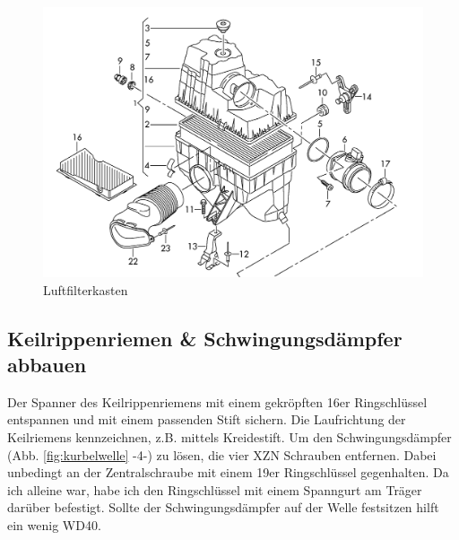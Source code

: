\documentclass[twoside,a4paper]{refart}
\begin{document}
\begin{figure}[htb]
	\begin{center}
		\includegraphics[width=\textwidth]{Luftfilterkasten}
		\caption{Luftfilterkasten}
		\label{fig:luftfilerkasten}
	\end{center}
\end{figure}

\newpage
\subsection{Keilrippenriemen \& Schwingungsdämpfer abbauen}
Der Spanner des Keilrippenriemens mit einem gekröpften 16er Ringschlüssel entspannen und mit einem passenden Stift sichern. Die Laufrichtung der Keilriemens kennzeichnen, z.B. mittels Kreidestift.
Um den Schwingungsdämpfer (Abb. \ref{fig:kurbelwelle} -4-) zu lösen, die vier XZN Schrauben entfernen. Dabei unbedingt an der Zentralschraube mit einem 19er Ringschlüssel gegenhalten. Da ich alleine war, habe ich den Ringschlüssel mit einem Spanngurt am Träger darüber befestigt. Sollte der Schwingungsdämpfer auf der Welle festsitzen hilft ein wenig WD40.
\end{document}
